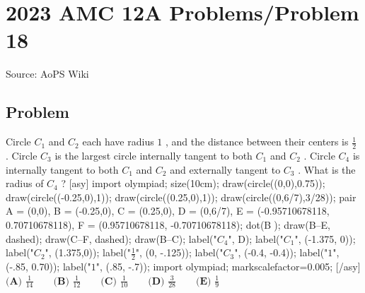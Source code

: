 \documentclass[12pt]{article}
\begin{document}
\section*{{2023 AMC 12A Problems/Problem 18}}
Source: AoPS Wiki

\subsection*{Problem}
Circle $C_1$ and $C_2$ each have radius $1$ , and the distance between their centers is $\frac{1}{2}$ . Circle $C_3$ is the largest circle internally tangent to both $C_1$ and $C_2$ . Circle $C_4$ is internally tangent to both $C_1$ and $C_2$ and externally tangent to $C_3$ . What is the radius of $C_4$ ? [asy] import olympiad; size(10cm); draw(circle((0,0),0.75)); draw(circle((-0.25,0),1)); draw(circle((0.25,0),1)); draw(circle((0,6/7),3/28)); pair A = (0,0), B = (-0.25,0), C = (0.25,0), D = (0,6/7), E = (-0.95710678118, 0.70710678118), F = (0.95710678118, -0.70710678118); dot(B^^C); draw(B--E, dashed); draw(C--F, dashed); draw(B--C); label("$C_4$", D); label("$C_1$", (-1.375, 0)); label("$C_2$", (1.375,0)); label("$\frac{1}{2}$", (0, -.125)); label("$C_3$", (-0.4, -0.4)); label("$1$", (-.85, 0.70)); label("$1$", (.85, -.7)); import olympiad; markscalefactor=0.005; [/asy] $\textbf{(A) } \frac{1}{14} \qquad \textbf{(B) } \frac{1}{12} \qquad \textbf{(C) } \frac{1}{10} \qquad \textbf{(D) } \frac{3}{28} \qquad \textbf{(E) } \frac{1}{9}$
\end{document}
